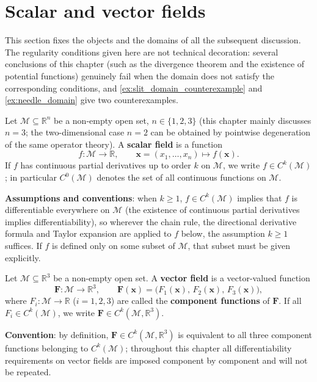 \section{Scalar and vector fields}

This section fixes the objects and the domains of all the subsequent discussion. The regularity conditions given here are not technical decoration: several conclusions of this chapter (such as the divergence theorem and the existence of potential functions) genuinely fail when the domain does not satisfy the corresponding conditions, and \cref{ex:slit_domain_counterexample} and \cref{ex:needle_domain} give two counterexamples.

\begin{definition}\label{def:scalar_field}
Let $\mathcal{M} \subseteq \mathbb{R}^n$ be a non-empty open set, $n \in \{1,2,3\}$ (this chapter mainly discusses $n=3$; the two-dimensional case $n=2$ can be obtained by pointwise degeneration of the same operator theory). A \textbf{scalar field} is a function
\[
f: \mathcal{M} \to \mathbb{R}, \qquad \mathbf{x} = (x_1, \dots, x_n) \mapsto f(\mathbf{x}).
\]
If $f$ has continuous partial derivatives up to order $k$ on $\mathcal{M}$, we write $f \in C^k(\mathcal{M})$; in particular $C^0(\mathcal{M})$ denotes the set of all continuous functions on $\mathcal{M}$.

\textbf{Assumptions and conventions}: when $k \ge 1$, $f \in C^k(\mathcal{M})$ implies that $f$ is differentiable everywhere on $\mathcal{M}$ (the existence of continuous partial derivatives implies differentiability), so wherever the chain rule, the directional derivative formula and Taylor expansion are applied to $f$ below, the assumption $k \ge 1$ suffices. If $f$ is defined only on some subset of $\mathcal{M}$, that subset must be given explicitly.
\end{definition}

\begin{definition}\label{def:vector_field}
Let $\mathcal{M} \subseteq \mathbb{R}^3$ be a non-empty open set. A \textbf{vector field} is a vector-valued function
\[
\mathbf{F}: \mathcal{M} \to \mathbb{R}^3, \qquad
\mathbf{F}(\mathbf{x}) = \bigl(F_1(\mathbf{x}),\, F_2(\mathbf{x}),\, F_3(\mathbf{x})\bigr),
\]
where $F_i: \mathcal{M} \to \mathbb{R}$ ($i=1,2,3$) are called the \textbf{component functions} of $\mathbf{F}$. If all $F_i \in C^k(\mathcal{M})$, we write $\mathbf{F} \in C^k(\mathcal{M}, \mathbb{R}^3)$.

\textbf{Convention}: by definition, $\mathbf{F} \in C^k(\mathcal{M},\mathbb R^3)$ is equivalent to all three component functions belonging to $C^k(\mathcal{M})$; throughout this chapter all differentiability requirements on vector fields are imposed component by component and will not be repeated.
\end{definition}

